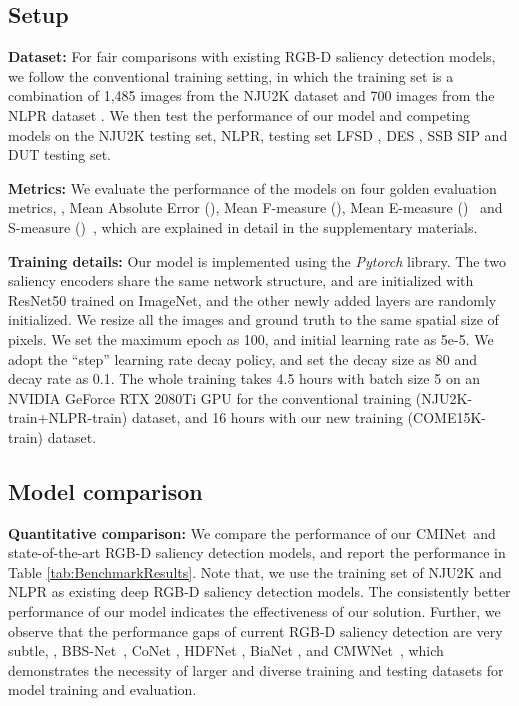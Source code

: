 \documentclass[10pt,twocolumn,letterpaper]{article}
\def\ourmodel{CMINet}
\def\ourdataset{COME15K}
\begin{document}
\subsection{Setup}
\noindent\textbf{Dataset:} For fair comparisons with existing RGB-D saliency detection models, we follow the conventional training setting, in which the training set is a combination of 1,485 images from the NJU2K
dataset \cite{NJU2000} and 700 images from the NLPR dataset \cite{peng2014rgbd}. We then test the performance of our model and competing models on the NJU2K testing set, NLPR, testing set 
LFSD \cite{li2014saliency}, DES \cite{cheng2014depth}, SSB \cite{niu2012leveraging} SIP \cite{sip_dataset} and DUT \cite{dmra_iccv19} testing set.

\noindent\textbf{Metrics:} We evaluate the performance of the models on four golden evaluation metrics, \ie, Mean Absolute Error (), Mean F-measure (), Mean E-measure ()~\cite{Fan2018Enhanced} and S-measure ()~\cite{fan2017structure}, which are explained in detail in the supplementary materials.




\noindent\textbf{Training details:} Our model is implemented using the \textit{Pytorch} library.
The two saliency encoders share the same network structure, and are initialized with ResNet50 \cite{ResHe2015} trained on ImageNet, and the other newly added layers are randomly initialized. We resize all the images and ground truth to the same spatial size of  pixels. We set the maximum epoch as 100, and initial learning rate as 5e-5. We adopt the \enquote{step} learning rate decay policy, and set the decay size as 80 and decay rate as 0.1. The whole training takes 4.5 hours with batch size 5 on an NVIDIA GeForce RTX 2080Ti GPU for the conventional training (NJU2K-train+NLPR-train)
dataset, and 16 hours with our new training (\ourdataset-train)
dataset.

\subsection{Model comparison}
\noindent\textbf{Quantitative comparison:} We compare the performance of our \ourmodel~and state-of-the-art RGB-D saliency detection models, and report the performance in Table \ref{tab:BenchmarkResults}. Note that, we use the training set of NJU2K and NLPR as existing deep RGB-D saliency detection models. 
The consistently better performance of our model indicates the effectiveness of our solution.
Further, we observe that the performance gaps of current RGB-D saliency detection are very subtle, \eg, BBS-Net~\cite{fan2020bbs}, CoNet \cite{ji2020accurate}, HDFNet \cite{HDFNet-ECCV2020}, BiaNet \cite{zhang2020bilateral}, and CMWNet~\cite{zhang2020bilateral}, which demonstrates the
necessity of
larger and diverse training and testing datasets for model training and evaluation.
\end{document}
